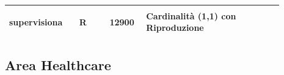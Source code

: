 \documentclass[12pt,a4paper]{article}
\begin{document}
\begin{center}
\begin{longtable}{|p{0.23\linewidth}|p{0.1\linewidth}|p{0.11\linewidth}|p{0.45\linewidth}|}
\hline
supervisiona 				& \begin{center}
\vspace{-25pt}R
\end{center}
					& \begin{center}
					\vspace{-25pt}12900\end{center}
					&  Cardinalità (1,1) con Riproduzione \\ 

\hline

\end{longtable}\end{center}


\subsection{Area Healthcare}
\end{document}
